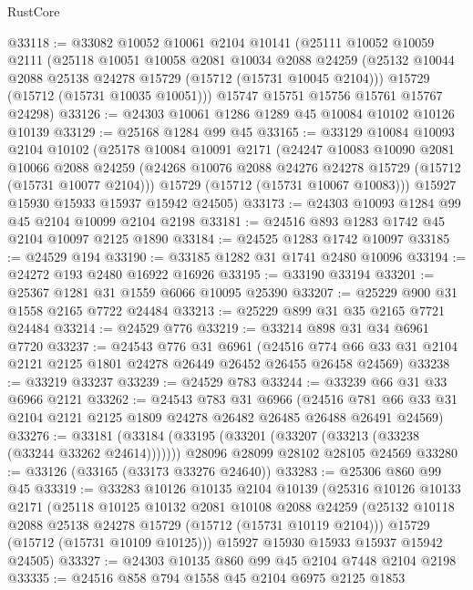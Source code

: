 \begin{lexlean}{RustCore}
\begin{coremodule}
@33118 := @33082
    @10052
    @10061
    @2104
    @10141
    (@25111
      @10052
      @10059
      @2111
      (@25118
        @10051
        @10058
        @2081
        @10034
        @2088
        @24259
        (@25132 @10044 @2088 @25138 @24278 @15729 (@15712 (@15731 @10045 @2104)))
        @15729
        (@15712 (@15731 @10035 @10051)))
      @15747
      @15751
      @15756
      @15761
      @15767
      @24298)
@33126 := @24303 @10061 @1286 @1289 @45 @10084 @10102 @10126 @10139
@33129 := @25168 @1284 @99 @45
@33165 := @33129
    @10084
    @10093
    @2104
    @10102
    (@25178
      @10084
      @10091
      @2171
      (@24247
        @10083
        @10090
        @2081
        @10066
        @2088
        @24259
        (@24268 @10076 @2088 @24276 @24278 @15729 (@15712 (@15731 @10077 @2104)))
        @15729
        (@15712 (@15731 @10067 @10083)))
      @15927
      @15930
      @15933
      @15937
      @15942
      @24505)
@33173 := @24303 @10093 @1284 @99 @45 @2104 @10099 @2104 @2198
@33181 := @24516 @893 @1283 @1742 @45 @2104 @10097 @2125 @1890
@33184 := @24525 @1283 @1742 @10097
@33185 := @24529 @194
@33190 := @33185 @1282 @31 @1741 @2480 @10096
@33194 := @24272 @193 @2480 @16922 @16926
@33195 := @33190 @33194
@33201 := @25367 @1281 @31 @1559 @6066 @10095 @25390
@33207 := @25229 @900 @31 @1558 @2165 @7722 @24484
@33213 := @25229 @899 @31 @35 @2165 @7721 @24484
@33214 := @24529 @776
@33219 := @33214 @898 @31 @34 @6961 @7720
@33237 := @24543
    @776
    @31
    @6961
    (@24516 @774 @66 @33 @31 @2104 @2121 @2125 @1801 @24278 @26449 @26452 @26455 @26458 @24569)
@33238 := @33219 @33237
@33239 := @24529 @783
@33244 := @33239 @66 @31 @33 @6966 @2121
@33262 := @24543
    @783
    @31
    @6966
    (@24516 @781 @66 @33 @31 @2104 @2121 @2125 @1809 @24278 @26482 @26485 @26488 @26491 @24569)
@33276 := @33181
    (@33184 (@33195 (@33201 (@33207 (@33213 (@33238 (@33244 @33262 @24614)))))))
    @28096
    @28099
    @28102
    @28105
    @24569
@33280 := @33126 (@33165 (@33173 @33276 @24640))
@33283 := @25306 @860 @99 @45
@33319 := @33283
    @10126
    @10135
    @2104
    @10139
    (@25316
      @10126
      @10133
      @2171
      (@25118
        @10125
        @10132
        @2081
        @10108
        @2088
        @24259
        (@25132 @10118 @2088 @25138 @24278 @15729 (@15712 (@15731 @10119 @2104)))
        @15729
        (@15712 (@15731 @10109 @10125)))
      @15927
      @15930
      @15933
      @15937
      @15942
      @24505)
@33327 := @24303 @10135 @860 @99 @45 @2104 @7448 @2104 @2198
@33335 := @24516 @858 @794 @1558 @45 @2104 @6975 @2125 @1853

\end{coremodule}
\end{lexlean}
